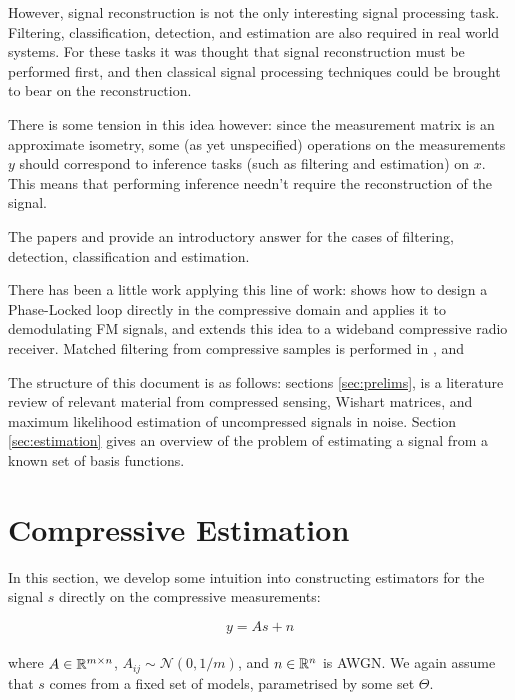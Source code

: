 However, signal reconstruction is not the only interesting signal processing task. Filtering, classification, detection, and estimation are also required in real world systems. For these tasks it was thought that signal reconstruction must be performed first, and then classical signal processing techniques could be brought to bear on the reconstruction. 

There is some tension in this idea however: since the measurement matrix is an approximate isometry, some (as yet unspecified) operations on the measurements \(y\) should correspond to inference tasks (such as filtering and estimation) on \(x\). This means that performing inference needn’t require the reconstruction of the signal. 

The papers \cite{davenport2010signal} and \cite{davenport2007smashed} provide an introductory answer for the cases of filtering, detection, classification and estimation.

There has been a little work applying this line of work: \cite{schnelle2012compressive} shows how to design a Phase-Locked loop directly in the compressive domain and applies it to demodulating FM signals, and \cite{davenport2010wideband} extends this idea to a wideband compressive radio receiver. Matched filtering from compressive samples is performed in \cite{eftekhari2013matched}, and 

The structure of this document is as follows: sections \eqref{sec:prelims}, is a literature review of relevant material from compressed sensing, Wishart matrices, and maximum likelihood estimation of uncompressed signals in noise. Section \eqref{sec:estimation} gives an overview of the problem of estimating a signal from a known set of basis functions. 

\section{Compressive Estimation} \label{sec:estimation}
In this section, we develop some intuition into constructing estimators for the signal \(s\) directly on the compressive measurements:

\begin{equation}
y = As + n
\end{equation}
\\
where \(A \in {\mathbb{R}}^{m \times n} \), \(A_{ij} \sim \mathcal{N}\left(0,1/m\right)\), and \(n \in {\mathbb{R}}^n\) is AWGN. We again assume that \(s\) comes from a fixed set of models, parametrised by some set \(\Theta\). 

